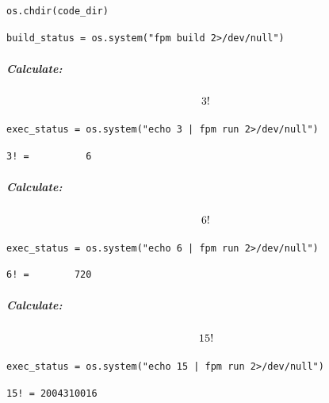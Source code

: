 \begin{verbatim}
os.chdir(code_dir)
\end{verbatim}

\begin{verbatim}
build_status = os.system("fpm build 2>/dev/null")
\end{verbatim}

\subparagraph{Calculate:}

\begin{equation}
\Large 3!
\end{equation}

\begin{verbatim}
exec_status = os.system("echo 3 | fpm run 2>/dev/null")
\end{verbatim}

\begin{verbatim}
3! =          6
\end{verbatim}

\subparagraph{Calculate:}

\begin{equation}
\Large 6!
\end{equation}

\begin{verbatim}
exec_status = os.system("echo 6 | fpm run 2>/dev/null")
\end{verbatim}

\begin{verbatim}
6! =        720
\end{verbatim}

\subparagraph{Calculate:}

\begin{equation}
\Large 15!
\end{equation}

\begin{verbatim}
exec_status = os.system("echo 15 | fpm run 2>/dev/null")
\end{verbatim}

\begin{verbatim}
15! = 2004310016
\end{verbatim}